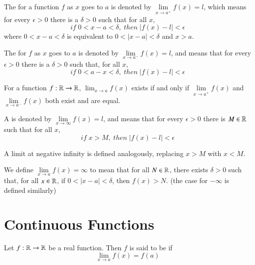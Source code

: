 \begin{defn}
    The  for a function $f$ as $x$ goes to $a$ is denoted by $\lim\limits_{x\rightarrow a^+}f(x) = l$, which means for every $\epsilon > 0$ there is a $\delta > 0$ such that for all $x$, $$if\;0 < x-a < \delta,\;then\;|f(x) - l|< \epsilon$$
    where $0 < x-a < \delta$ is equivalent to $0 < |x-a| < \delta$ and $x > a$.

    The  for $f$ as $x$ goes to $a$ is denoted by $\lim\limits_{x\rightarrow a^-}f(x) = l$, and means that for every $\epsilon > 0$ there is a $\delta > 0$ such that, for all $x$, $$if\;0 < a-x < \delta,\;then\;|f(x) - l| < \epsilon$$
\end{defn}


\begin{rmk}
    For a function $f:\mathbb R\rightarrow \mathbb R$, $\lim_{x\rightarrow a}f(x)$ exists if and only if $\lim\limits_{x\rightarrow a^+}f(x)$ and $\lim\limits_{x\rightarrow a^-}f(x)$ both exist and are equal.
\end{rmk}


\begin{defn}
    A  is denoted by $\lim\limits_{x\rightarrow \infty}f(x) = l$, and means that for every $\epsilon > 0$ there is $M \in \mathbb R$ such that for all $x$, $$if\;x>M,\;then\;|f(x) - l| < \epsilon$$

    A limit at negative infinity is defined analogously, replacing $x> M$ with $x < M$.
\end{defn}


\begin{defn}
    We define $\lim\limits_{x\rightarrow a}f(x) = \infty$ to mean that for all $N \in \mathbb R$, there exists $\delta > 0$ such that, for all $x \in \mathbb R$, if $0 < |x-a| < \delta$, then $f(x) > N$. (the case for $-\infty$ is defined similarly)
\end{defn}



\section{Continuous Functions}


\begin{defn}[Continuity]
    Let $f:\mathbb R\rightarrow \mathbb R$ be a real function. Then $f$ is said to be  if \begin{equation}
        \lim\limits_{x\rightarrow a}f(x) = f(a)
    \end{equation}
\end{defn}


